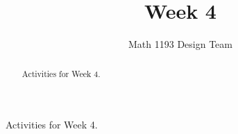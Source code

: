 \documentclass[noauthor]{ximera}
\title{Week 4}
\author{Math 1193 Design Team}
\begin{document}
\begin{abstract}
    Activities for Week 4.
\end{abstract}
\maketitle

Activities for Week 4.
\end{document}
